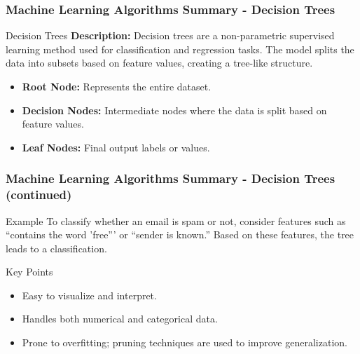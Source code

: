 \documentclass[aspectratio=169]{beamer}
\begin{document}
\begin{frame}[fragile]
    \frametitle{Machine Learning Algorithms Summary - Decision Trees}
    \begin{block}{Decision Trees}
        \textbf{Description:} Decision trees are a non-parametric supervised learning method used for 
        classification and regression tasks. The model splits the data into subsets based on feature 
        values, creating a tree-like structure.
    \end{block}
    \begin{itemize}
        \item \textbf{Root Node:} Represents the entire dataset.
        \item \textbf{Decision Nodes:} Intermediate nodes where the data is split based on feature values.
        \item \textbf{Leaf Nodes:} Final output labels or values.
    \end{itemize}
\end{frame}

\begin{frame}[fragile]
    \frametitle{Machine Learning Algorithms Summary - Decision Trees (continued)}
    \begin{block}{Example}
        To classify whether an email is spam or not, consider features such as 
        ``contains the word 'free''' or ``sender is known.'' Based on these features, 
        the tree leads to a classification.
    \end{block}
    \begin{block}{Key Points}
        \begin{itemize}
            \item Easy to visualize and interpret.
            \item Handles both numerical and categorical data.
            \item Prone to overfitting; pruning techniques are used to improve generalization.
        \end{itemize}
    \end{block}
\end{frame}
\end{document}
